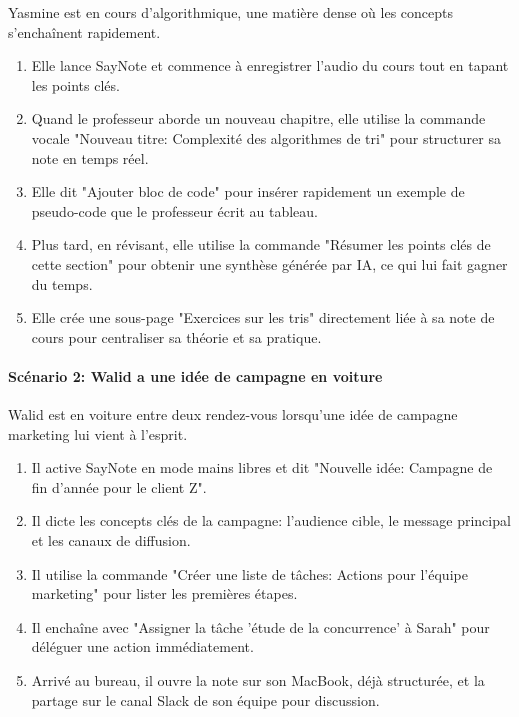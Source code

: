     Yasmine est en cours d'algorithmique, une matière dense où les concepts s'enchaînent rapidement.
    \begin{enumerate}
        \item Elle lance SayNote et commence à enregistrer l'audio du cours tout en tapant les points clés.
        \item Quand le professeur aborde un nouveau chapitre, elle utilise la commande vocale "Nouveau titre: Complexité des algorithmes de tri" pour structurer sa note en temps réel.
        \item Elle dit "Ajouter bloc de code" pour insérer rapidement un exemple de pseudo-code que le professeur écrit au tableau.
        \item Plus tard, en révisant, elle utilise la commande "Résumer les points clés de cette section" pour obtenir une synthèse générée par IA, ce qui lui fait gagner du temps.
        \item Elle crée une sous-page "Exercices sur les tris" directement liée à sa note de cours pour centraliser sa théorie et sa pratique.
    \end{enumerate}
    
    \paragraph{Scénario 2: Walid a une idée de campagne en voiture}
    
    Walid est en voiture entre deux rendez-vous lorsqu'une idée de campagne marketing lui vient à l'esprit.
    \begin{enumerate}
        \item Il active SayNote en mode mains libres et dit "Nouvelle idée: Campagne de fin d'année pour le client Z".
        \item Il dicte les concepts clés de la campagne: l'audience cible, le message principal et les canaux de diffusion.
        \item Il utilise la commande "Créer une liste de tâches: Actions pour l'équipe marketing" pour lister les premières étapes.
        \item Il enchaîne avec "Assigner la tâche 'étude de la concurrence' à Sarah" pour déléguer une action immédiatement.
        \item Arrivé au bureau, il ouvre la note sur son MacBook, déjà structurée, et la partage sur le canal Slack de son équipe pour discussion.
    \end{enumerate}
    
